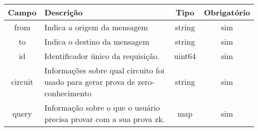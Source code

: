 \begin{table}[h]
    \centering
    \begin{tabular}{|c|p{8cm}|c|c|}
    \hline
    \rowcolor{lightgray} \textbf{Campo} & \textbf{Descrição} & \textbf{Tipo} & \textbf{Obrigatório} \\
    \hline
    from & Indica a origem da mensagem & string & sim \\
    \hline
    to & Indica o destino da mensagem & string & sim \\ 
    \hline
    id & Identificador único da requisição. & uint64 & sim \\
    \hline
    circuit & Informações sobre qual circuito foi usado para gerar prova de zero-conhecimento  & string & sim \\
    \hline
    query & Informação sobre o que o usuário precisa provar com a sua prova zk. & map & sim \\
    \hline
    \end{tabular}
\end{table}